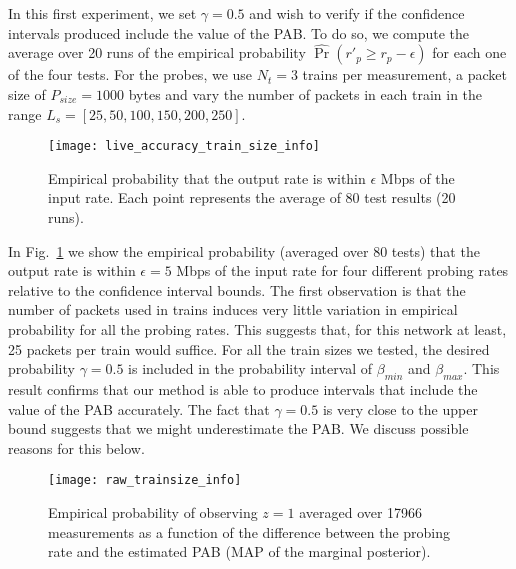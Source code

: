 \documentclass[final,5p,times,twocolumn]{elsarticle}
\begin{document}
In this first experiment, we set $\gamma=0.5$ and wish to verify if the confidence intervals produced include the value of the PAB.  To do so, we compute the average over 20 runs of the empirical probability $\widehat{\Pr} (r'_p \geq r_p - \epsilon)$ for each one of the four tests.  
For the probes, we use $N_t=3$ trains per measurement, a packet size of $P_{size}=1000$ bytes and vary the number of packets in each train in the range $L_s=[25,50,100,150,200,250]$.  

\begin{figure}[!h]
	\centering
	\texttt{[image: live\_accuracy\_train\_size\_info]}
	\caption{Empirical probability that the output rate is within $\epsilon$ Mbps of the input rate.  Each point represents the average of 80 test results (20 runs).\label{fig:live_accuracy_train_size_info}}
\end{figure}

In Fig.~\ref{fig:live_accuracy_train_size_info} we show the empirical probability (averaged over 80 tests) that the output rate is within $\epsilon=5$ Mbps of the input rate for four different probing rates relative to the confidence interval bounds.  The first observation is that the number of packets used in trains induces very little variation in empirical probability for all the probing rates.  This suggests that, for this network at least, 25 packets per train would suffice.  For all the train sizes we tested, the desired probability $\gamma=0.5$ is included in the probability interval of $\beta_{min}$ and $\beta_{max}$.  This result confirms that our method is able to produce intervals that include the value of the PAB accurately.  The fact that $\gamma=0.5$ is very close to the upper bound suggests that we might underestimate the PAB.  We discuss possible reasons for this below.

\begin{figure}[!h]
	\centering
	\texttt{[image: raw\_trainsize\_info]}
	\caption{Empirical probability of observing $z=1$ averaged over 17966 measurements as a function of the difference between the probing rate and the estimated PAB (MAP of the marginal posterior).\label{fig:raw_trainsize_info}}
\end{figure}	
\end{document}
